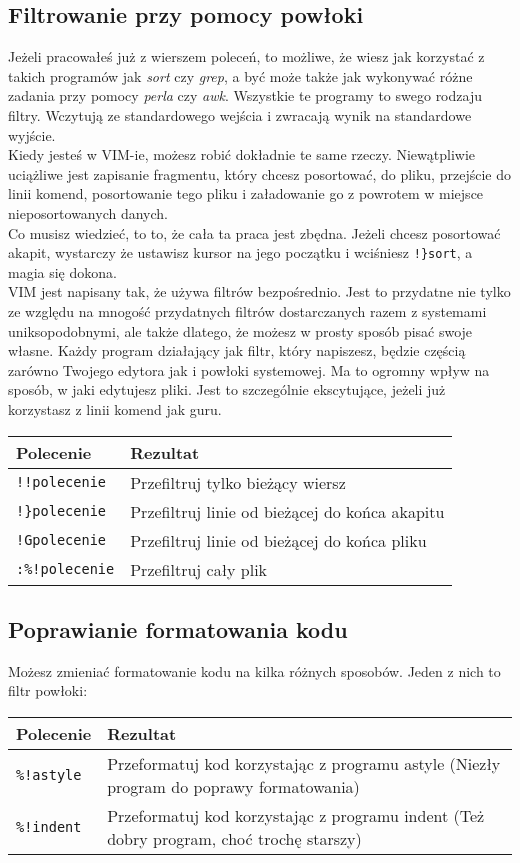 \documentclass[a4paper,12pt]{article}
\begin{document}
\subsection{Filtrowanie przy pomocy powłoki}
Jeżeli pracowałeś już z wierszem poleceń, to możliwe, że wiesz jak korzystać z takich programów jak {\it sort} czy {\it grep}, a być może także jak wykonywać różne zadania przy pomocy {\it perla} czy {\it awk}. Wszystkie te programy to swego rodzaju filtry. Wczytują ze standardowego wejścia i zwracają wynik na standardowe wyjście.\\
Kiedy jesteś w VIM-ie, możesz robić dokładnie te same rzeczy. Niewątpliwie uciążliwe jest zapisanie fragmentu, który chcesz posortować, do pliku, przejście do linii komend, posortowanie tego pliku i załadowanie go z powrotem w miejsce nieposortowanych danych.\\ 
Co musisz wiedzieć, to to, że cała ta praca jest zbędna. Jeżeli chcesz posortować akapit, wystarczy że ustawisz kursor na jego początku i wciśniesz {\tt !\}sort}, a magia się dokona.\\
VIM jest napisany tak, że używa filtrów bezpośrednio. Jest to przydatne nie tylko ze względu na mnogość przydatnych filtrów dostarczanych razem z systemami uniksopodobnymi, ale także dlatego, że możesz w prosty sposób pisać swoje własne. Każdy program działający jak filtr, który napiszesz, będzie częścią zarówno Twojego edytora jak i powłoki systemowej. Ma to ogromny wpływ na sposób, w jaki edytujesz pliki. Jest to szczególnie ekscytujące, jeżeli już korzystasz z linii komend jak guru.

\begin{tabular}{ l | p{} }
{\bf Polecenie} & {\bf Rezultat} \\ \hline
{\tt !!polecenie} & Przefiltruj tylko bieżący wiersz \\
{\tt !\}polecenie} & Przefiltruj linie od bieżącej do końca akapitu \\
{\tt !Gpolecenie} & Przefiltruj linie od bieżącej do końca pliku \\
{\tt :\%!polecenie} & Przefiltruj cały plik \\ \hline
\end{tabular}
\subsection{Poprawianie formatowania kodu}
Możesz zmieniać formatowanie kodu na kilka różnych sposobów. Jeden z nich to filtr powłoki:

\begin{tabular}{ l | p{} }
{\bf Polecenie} & {\bf Rezultat} \\ \hline
{\tt \%!astyle} & Przeformatuj kod korzystając z programu astyle (Niezły program do poprawy formatowania)\\
{\tt \%!indent} & Przeformatuj kod korzystając z programu indent (Też dobry program, choć trochę starszy) \\ \hline
\end{tabular}\newpage
\end{document}

